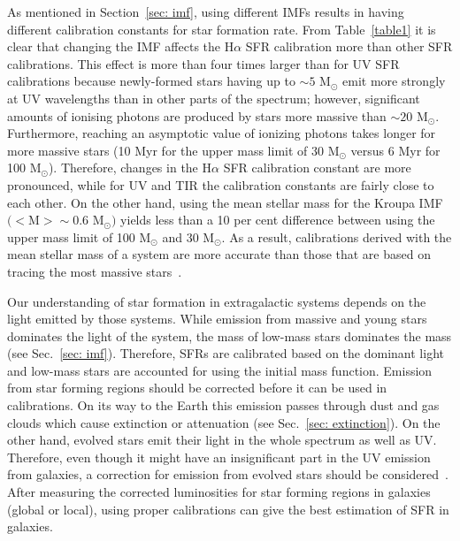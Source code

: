 As mentioned in Section~\ref{sec: imf}, using different IMFs results in having different calibration constants for star formation rate. 
From Table~\ref{table1} it is clear that changing the IMF affects the H${\alpha}$ SFR calibration more than other SFR calibrations. 
This effect is more than four times larger than for UV SFR calibrations because newly-formed stars having up to $\sim 5$ M$_{\odot}$ emit more strongly at UV wavelengths than in other parts of the spectrum; however, significant amounts of ionising photons are produced by stars more massive than $\sim 20$ M$_{\odot}$.
Furthermore, reaching an asymptotic value of ionizing photons takes longer for more massive stars (10 Myr for the upper mass limit of 30 M$_{\odot}$ versus 6 Myr for 100 M$_{\odot}$). 
Therefore, changes in the H${\alpha}$ SFR calibration constant are more pronounced, while for UV and TIR the calibration constants are fairly close to each other.
On the other hand, using the mean stellar mass for the Kroupa IMF $(<$M$> \sim 0.6$ M$_{\odot})$ yields less than a 10 per cent difference between using the upper mass limit of 100 M$_{\odot}$ and 30 M$_{\odot}$. 
As a result, calibrations derived with the mean stellar mass of a system are more accurate than those that are based on tracing the most massive stars~\citep{Calzetti13}.

Our understanding of star formation in extragalactic systems depends on the light emitted by those systems.
While emission from massive and young stars dominates the light of the system, the mass of low-mass stars dominates the mass  (see Sec.~\ref{sec: imf}).
Therefore, SFRs are calibrated based on the dominant light and low-mass stars are accounted for using the initial mass function.
Emission from star forming regions should be corrected before it can be used in calibrations.
On its way to the Earth this emission passes through dust and gas clouds which cause extinction or attenuation (see Sec.~\ref{sec: extinction}).
On the other hand, evolved stars emit their light in the whole spectrum as well as UV. 
Therefore, even though it might have an insignificant part in the UV emission from galaxies, a correction for emission from evolved stars should be considered~\citep{Leroy08}.
After measuring the corrected luminosities for star forming regions in galaxies (global or local), using proper calibrations can give the best estimation of SFR in galaxies. 





